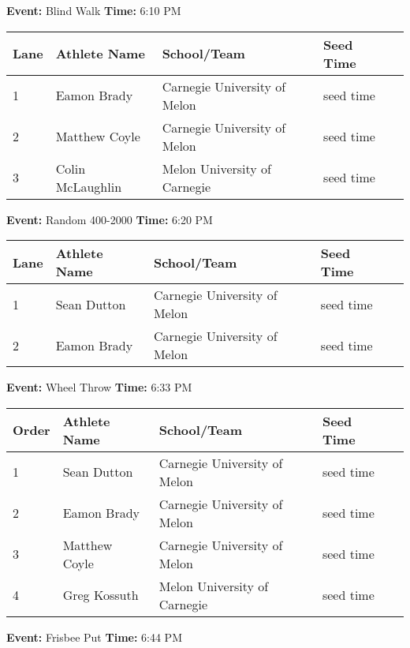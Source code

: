 \documentclass[11pt]{article}
\begin{document}
\textbf{Event:} Blind Walk \quad \textbf{Time:} 6:10 PM 

\vspace{1em}
\begin{tabular}{@{}lllll@{}}
\toprule
\textbf{Lane} & \textbf{Athlete Name} & \textbf{School/Team} & \textbf{Seed Time} \\
\midrule
1 & Eamon Brady & Carnegie University of Melon & seed time &\\
2 & Matthew Coyle & Carnegie University of Melon & seed time &\\
3 & Colin McLaughlin & Melon University of Carnegie & seed time &\\
\bottomrule
\end{tabular}
\vspace{2.5em}


\textbf{Event:} Random 400-2000 \quad \textbf{Time:} 6:20 PM 

\vspace{1em}
\begin{tabular}{@{}lllll@{}}
\toprule
\textbf{Lane} & \textbf{Athlete Name} & \textbf{School/Team} & \textbf{Seed Time} \\
\midrule
1 & Sean Dutton & Carnegie University of Melon & seed time &\\
2 & Eamon Brady & Carnegie University of Melon & seed time &\\
\bottomrule
\end{tabular}
\vspace{2.5em}


\textbf{Event:} Wheel Throw \quad \textbf{Time:} 6:33 PM 

\vspace{1em}
\begin{tabular}{@{}lllll@{}}
\toprule
\textbf{Order} & \textbf{Athlete Name} & \textbf{School/Team} & \textbf{Seed Time} \\
\midrule
1 & Sean Dutton & Carnegie University of Melon & seed time &\\
2 & Eamon Brady & Carnegie University of Melon & seed time &\\
3 & Matthew Coyle & Carnegie University of Melon & seed time &\\
4 & Greg Kossuth & Melon University of Carnegie & seed time &\\
\bottomrule
\end{tabular}
\vspace{2.5em}


\textbf{Event:} Frisbee Put \quad \textbf{Time:} 6:44 PM 
\end{document}

